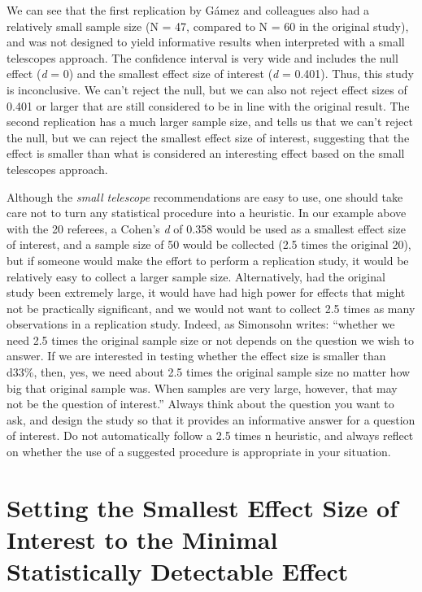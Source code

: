 \documentclass[
  oneside]{book}
\begin{document}
We can see that the first replication by Gámez and colleagues also had a relatively small sample size (N = 47, compared to N = 60 in the original study), and was not designed to yield informative results when interpreted with a small telescopes approach. The confidence interval is very wide and includes the null effect (\emph{d} = 0) and the smallest effect size of interest (\emph{d} = 0.401). Thus, this study is inconclusive. We can't reject the null, but we can also not reject effect sizes of 0.401 or larger that are still considered to be in line with the original result. The second replication has a much larger sample size, and tells us that we can't reject the null, but we can reject the smallest effect size of interest, suggesting that the effect is smaller than what is considered an interesting effect based on the small telescopes approach.

Although the \emph{small telescope} recommendations are easy to use, one should take care not to turn any statistical procedure into a heuristic. In our example above with the 20 referees, a Cohen's \emph{d} of 0.358 would be used as a smallest effect size of interest, and a sample size of 50 would be collected (2.5 times the original 20), but if someone would make the effort to perform a replication study, it would be relatively easy to collect a larger sample size. Alternatively, had the original study been extremely large, it would have had high power for effects that might not be practically significant, and we would not want to collect 2.5 times as many observations in a replication study. Indeed, as Simonsohn writes: ``whether we need 2.5 times the original sample size or not depends on the question we wish to answer. If we are interested in testing whether the effect size is smaller than d33\%, then, yes, we need about 2.5 times the original sample size no matter how big that original sample was. When samples are very large, however, that may not be the question of interest.'' Always think about the question you want to ask, and design the study so that it provides an informative answer for a question of interest. Do not automatically follow a 2.5 times n heuristic, and always reflect on whether the use of a suggested procedure is appropriate in your situation.

\hypertarget{setting-the-smallest-effect-size-of-interest-to-the-minimal-statistically-detectable-effect}{%
\section{Setting the Smallest Effect Size of Interest to the Minimal Statistically Detectable Effect}\label{setting-the-smallest-effect-size-of-interest-to-the-minimal-statistically-detectable-effect}}
\end{document}
